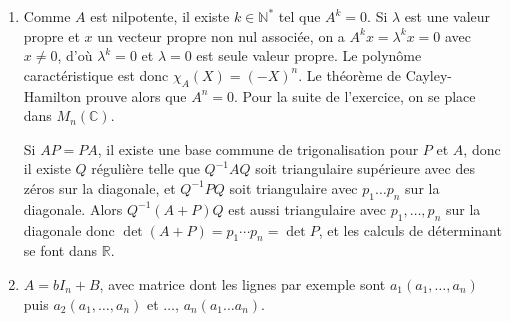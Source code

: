 \begin{enumerate}[label=\arabic*.,leftmargin=2.2em,itemsep=1.1em]
Si $\mathcal B=\{e_1,\ldots,e_n\}$ est une base de vecteurs propres pour les valeurs propres $\lambda_1,\ldots,\lambda_n$, le vecteur $x=\sum_{i=1}^n x_i e_i$ est cyclique si et seulement si la famille $\{x,f(x),\ldots,f^{n-1}(x)\}$ est libre vu ce qui précède. La matrice des composantes de ces vecteurs dans la base $\mathcal B$ est
\[
A=\begin{pmatrix}
x_1&\lambda_1x_1&\cdots&\lambda_1^{n-1}x_1\\
x_2&\lambda_2x_2&\cdots&\lambda_2^{n-1}x_2\\
\vdots&\vdots&&\vdots\\
x_n&\lambda_nx_n&\cdots&\lambda_n^{n-1}x_n
\end{pmatrix}
\]
de déterminant
\[
\det A=(x_1x_2\cdots x_n)\det\operatorname{Van\ der\ Monde}(\lambda_1,\lambda_2,\ldots,\lambda_n).
\]
Donc, s'il y a une valeur propre multiple, $\det A$ nul pour tout $x$, pas de vecteur cyclique pour $f$, et si toutes les valeurs propres sont distinctes,
\[
\begin{aligned}
(x\text{ cyclique})\Longleftrightarrow{}&
(x\text{ a chaque coordonnée non nulle}\\
&\text{ suivant chaque vecteur propre de la base }\mathcal B).
\end{aligned}
\]
(Voir Chapitre 9, exercice n$^\circ$ 6 pour Van der Monde).

\item Comme $A$ est nilpotente, il existe $k\in\mathbb N^*$ tel que $A^k=0$. Si $\lambda$ est une valeur propre et $x$ un vecteur propre non nul associée, on a $A^kx=\lambda^kx=0$ avec $x\ne0$, d'où $\lambda^k=0$ et $\lambda=0$ est seule valeur propre. Le polynôme caractéristique est donc $\chi_A(X)=(-X)^n$. Le théorème de Cayley-Hamilton prouve alors que $A^n=0$. Pour la suite de l'exercice, on se place dans $M_n(\mathbb C)$.

Si $AP=PA$, il existe une base commune de trigonalisation pour $P$ et $A$, donc il existe $Q$ régulière telle que $Q^{-1}AQ$ soit triangulaire supérieure avec des zéros sur la diagonale, et $Q^{-1}PQ$ soit triangulaire avec $p_1\ldots p_n$ sur la diagonale. Alors $Q^{-1}(A+P)Q$ est aussi triangulaire avec $p_1,\ldots,p_n$ sur la diagonale donc $\det(A+P)=p_1\cdots p_n=\det P$, et les calculs de déterminant se font dans $\mathbb R$.

\item $A=bI_n+B$, avec  matrice dont les lignes par exemple sont $a_1(a_1,\ldots,a_n)$ puis $a_2(a_1,\ldots,a_n)$ et $\ldots$, $a_n(a_1\ldots a_n)$.


\end{enumerate}
